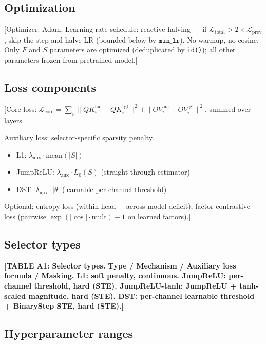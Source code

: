 \documentclass[11pt]{article}
\begin{document}
\subsection{Optimization}

[Optimizer: Adam. Learning rate schedule: reactive halving --- if
$\mathcal{L}_{\text{total}} > 2 \times \mathcal{L}_{\text{prev}}$,
skip the step and halve LR (bounded below by $\texttt{min\_lr}$).
No warmup, no cosine. Only $F$ and $S$ parameters are optimized
(deduplicated by \texttt{id()}); all other parameters frozen from
pretrained model.]

\subsection{Loss components}

[Core loss: $\mathcal{L}_{\text{core}} = \sum_i \|QK_i^{\text{fac}} -
QK_i^{\text{tgt}}\|^2 + \|OV_i^{\text{fac}} - OV_i^{\text{tgt}}\|^2$,
summed over layers.

Auxiliary loss: selector-specific sparsity penalty.
\begin{itemize}
\item L1: $\lambda_{\text{aux}} \cdot \text{mean}(|S|)$
\item JumpReLU: $\lambda_{\text{aux}} \cdot L_0(S)$ (straight-through estimator)
\item DST: $\lambda_{\text{aux}} \cdot |\theta|$ (learnable per-channel threshold)
\end{itemize}

Optional: entropy loss (within-head + across-model deficit),
factor contrastive loss (pairwise $\exp(|\cos| \cdot \text{mult}) - 1$
on learned factors).]

\subsection{Selector types}

\textbf{[TABLE A1: Selector types. Type / Mechanism / Auxiliary loss formula / Masking.
L1: soft penalty, continuous.
JumpReLU: per-channel threshold, hard (STE).
JumpReLU-tanh: JumpReLU + tanh-scaled magnitude, hard (STE).
DST: per-channel learnable threshold + BinaryStep STE, hard (STE).]}

\subsection{Hyperparameter ranges}
\end{document}
